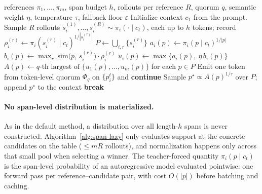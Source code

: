 \documentclass[11pt]{article}
\begin{document}
\begin{algorithm}[htbp]
\caption{Span-level lazy consensus: support evaluated only at candidates (modified)}
\label{alg:span-lazy}
\begin{algorithmic}[1]
\Require references $\pi_1,\dots,\pi_m$, span budget $h$, rollouts per reference $R$, quorum $q$, semantic weight $\eta$, temperature $\tau$, fallback floor $\varepsilon$
\State Initialize context $c_1$ from the prompt.
        \State Sample $R$ rollouts $s_i^{(1)},\dots,s_i^{(R)}\sim\pi_i(\cdot\mid c_t)$, each up to $h$ tokens; record $\rho_i^{(r)}\gets\pi_i(s_i^{(r)}\mid c_t)^{1/|s_i^{(r)}|}$
    \EndFor
    \State $P\gets\bigcup_{i,r}\{s_i^{(r)}\}$ 
        \State $a_i(p)\gets\pi_i(p\mid c_t)^{1/|p|}$ 
        \State $b_i(p)\gets\max_r\ \mathrm{sim}\bigl(p,\,s_i^{(r)}\bigr)\cdot\rho_i^{(r)}$ 
        \State $u_i(p)\gets\max\{a_i(p),\ \eta\,b_i(p)\}$
    \EndFor
    \State $A(p)\gets q\text{-th largest of }\{u_1(p),\dots,u_m(p)\}$ for each $p\in P$ 
     
        \State Emit one token from token-level quorum $\Phi_q$ on $\{p_i^t\}$ and \textbf{continue}
    \EndIf
    \State Sample $p^\star\propto A(p)^{1/\tau}$ over $P$; append $p^\star$ to the context
        \State \textbf{break}
    \EndIf
\EndFor
\end{algorithmic}
\end{algorithm}

\paragraph{No span-level distribution is materialized.} As in the default method, a distribution over all length-$h$ spans is never constructed. Algorithm~\ref{alg:span-lazy} only evaluates support at the concrete candidates on the table ($\le mR$ rollouts), and normalization happens only across that small pool when selecting a winner. The teacher-forced quantity $\pi_i(p\mid c_t)$ is the span-level probability of an autoregressive model evaluated pointwise: one forward pass per reference--candidate pair, with cost $O(|p|)$ before batching and caching.
\end{document}
